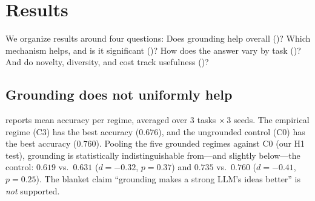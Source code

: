 \section{Results}
\label{sec:results}

We organize results around four questions: Does grounding help overall
()? Which mechanism helps, and is it significant
()? How does the answer vary by task
()? And do novelty, diversity, and cost track usefulness
()?

\subsection{Grounding does not uniformly help}
\label{sec:res-aggregate}

 reports mean accuracy per regime, averaged over $3$ tasks
$\times\, 3$ seeds. The empirical regime (C3) has the best \IND{} accuracy
($0.676$), and the ungrounded control (C0) has the best \OOD{} accuracy ($0.760$).
Pooling the five grounded regimes against C0 (our H1 test), grounding is
statistically indistinguishable from---and slightly below---the control: \IND{}
$0.619$ vs.\ $0.631$ ($d{=}-0.32$, $p{=}0.37$) and \OOD{} $0.735$ vs.\ $0.760$
($d{=}-0.41$, $p{=}0.25$). The blanket claim ``grounding makes a strong LLM's ideas
better'' is \emph{not} supported.

\begin{table}[t]
\centering
\caption{Aggregate accuracy by regime (mean over $3$ tasks $\times\, 3$ seeds).
\textbf{Best per column in bold.} Grounding does not uniformly beat the ungrounded
control C0: C3 (empirical) is best \IND, but C0 is best \OOD. Diversity is mean
pairwise cosine distance within a bank; novelty distance is mean cosine distance to
the held-out expert hypotheses; generation tokens per bank span $\sim\!80\times$.}
\label{tab:aggregate}
\end{table}

